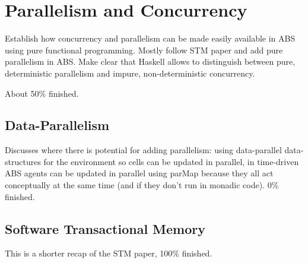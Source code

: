 \chapter{Parallelism and Concurrency}
Establish how concurrency and parallelism can be made easily available in ABS using pure functional programming. Mostly follow STM paper and add pure parallelism in ABS. Make clear that Haskell allows to distinguish between pure, deterministic parallelism and impure, non-deterministic concurrency.

About 50\% finished.

\section{Data-Parallelism}
Discusses where there is potential for adding parallelism: using data-parallel data-structures for the environment so cells can be updated in parallel, in time-driven ABS agents can be updated in parallel using parMap because they all act conceptually at the same time (and if they don't run in monadic code). 0\% finished.

\section{Software Transactional Memory}
This is a shorter recap of the STM paper, 100\% finished.